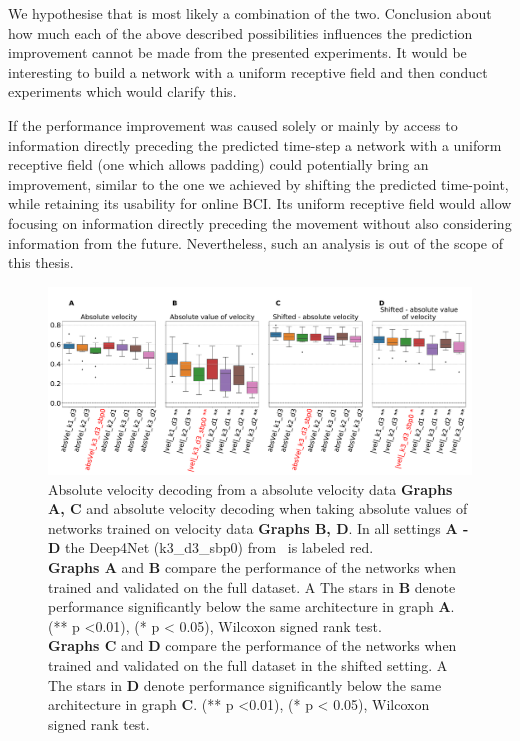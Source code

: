 We hypothesise that is most likely a combination of the two.
Conclusion about how much each of the above described possibilities influences the prediction improvement cannot be made from the presented experiments.
It would be interesting to build a network with a uniform receptive field and then conduct experiments which would clarify this.

If the performance improvement was caused solely or mainly by access to information directly preceding the predicted time-step a network with a uniform receptive field (one which allows padding) could potentially bring an improvement, similar to the one we achieved by shifting the predicted time-point, while retaining its usability for online BCI.
Its uniform receptive field would allow focusing on information directly preceding the movement without also considering information from the future.
Nevertheless, such an analysis is out of the scope of this thesis.

    
\begin{figure}[!htpb]
\centering
   \includegraphics[width=1\linewidth]{img/ch4/absVel_vs_abs_vel_performance_comparison}
   \caption[Absolute velocity vs. absolute value of velocity comparison]{Absolute velocity decoding from a absolute velocity data \textbf{Graphs A, C} and absolute velocity decoding when taking absolute values of networks trained on velocity data \textbf{Graphs B, D}. In all settings \textbf{
   A - D} the Deep4Net (k3\_d3\_sbp0) from~\cite{Hammer-2021} is labeled red.\\ \textbf{Graphs A} and \textbf{B} compare the performance of the networks when trained and validated on the full dataset. A The stars in \textbf{B} denote performance significantly below the same architecture in graph \textbf{A}. (** p <0.01), (* p < 0.05), Wilcoxon signed rank test.
   \\\textbf{Graphs C} and \textbf{D} compare the performance of the networks when trained and validated on the full dataset in the shifted setting. A The stars in \textbf{D} denote performance significantly below the same architecture in graph \textbf{C}. (** p <0.01), (* p < 0.05), Wilcoxon signed rank test.}
   \label{fig:absVel-vs-abs-vel-performance}
\end{figure}


